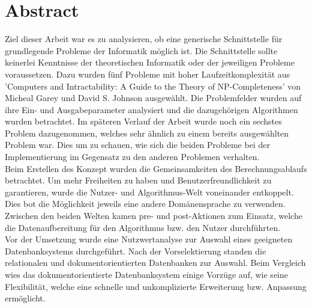 %
%

\thispagestyle{empty}


\newpage
\thispagestyle{empty}
\chapter*{Abstract}\label{abstract}
Ziel dieser Arbeit war es zu analysieren, ob eine generische Schnittstelle für grundlegende Probleme der Informatik möglich ist. Die Schnittstelle sollte keinerlei Kenntnisse 
der theoretischen Informatik oder der jeweiligen Probleme voraussetzen. Dazu wurden fünf Probleme mit hoher Laufzeitkomplexität aus 'Computers and Intractability: A Guide to the Theory of 
NP-Completeness' von Micheal Garey und David S. Johnson ausgewählt. Die Problemfelder wurden auf ihre Ein- und Ausgabeparameter analysiert und die dazugehörigen 
Algorithmen wurden betrachtet. Im späteren Verlauf der Arbeit wurde noch ein sechstes Problem dazugenommen, welches sehr ähnlich zu einem bereits ausgewählten Problem war. Dies 
um zu schauen, wie sich die beiden Probleme bei der Implementierung im Gegensatz zu den anderen Problemen verhalten.\\

Beim Erstellen des Konzept wurden die Gemeinsamkeiten des Berechnungsablaufs betrachtet. Um mehr Freiheiten zu haben und Benutzerfreundlichkeit zu garantieren, wurde die Nutzer- und 
Algorithmus-Welt voneinander entkoppelt. Dies bot die Möglichkeit jeweils eine andere Domänensprache zu verwenden. Zwischen den beiden Welten kamen pre- und post-Aktionen zum Einsatz, 
welche die Datenaufbereitung für den Algorithmus bzw. den Nutzer durchführten.\\

Vor der Umsetzung wurde eine Nutzwertanalyse zur Auswahl eines geeigneten Datenbanksystems durchgeführt. Nach der Vorselektierung standen die relationalen und dokumentorientierten 
Datenbanken zur Auswahl. Beim Vergleich wies das dokumentorientierte Datenbanksystem einige Vorzüge auf, wie seine Flexibilität, welche eine schnelle und unkomplizierte Erweiterung bzw. 
Anpassung ermöglicht.\\


